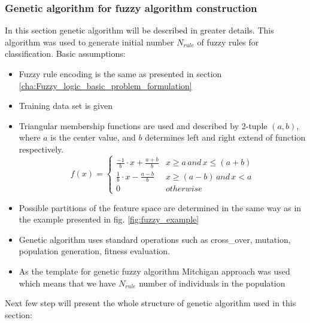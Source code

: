 \subsubsection{Genetic algorithm for  fuzzy algorithm construction}
\label{cha:Fuzzy_logic_genetic_algorithm}
In this section genetic algorithm will be described in greater details. This
algorithm was used to generate initial number $N_{rule}$ of fuzzy rules for
classification. 
Basic assumptions:
\begin{itemize}
    \item Fuzzy rule encoding is the same as presented in section \ref{cha:Fuzzy_logic_basic_problem_formulation}
    \item Training data set is given
    \item Triangular membership functions are used and described by 2-tuple
        $(a, b)$, where $a$ is the center value, and
        $b$ determines left and right extend of function respectively.
        \begin{equation}
            f(x) = 
            \begin{cases}
                \frac{-1}{b}\cdot x + \frac{a+b}{b} &
                x \geq a \, and \, x \leq (a+b) \\
                \frac{1}{b}\cdot x - \frac{a-b}{b} &
                x \geq (a - b)\, and\, x < a \\
                0 & otherwise
            \end{cases}
            \label{eq:fuzzy_function}
        \end{equation}
    \item Possible partitions of the feature space are determined in the same
        way as in the example presented in fig. \ref{fig:fuzzy_example}
    \item Genetic algorithm uses standard operations such as cross\_over,
        mutation, population generation, fitness evaluation.
    \item As the template for genetic fuzzy algorithm Mitchigan approach was
        used which means that we have $N_{rule}$ number of individuals in the
        population
\end{itemize}
Next few step will present the whole structure of genetic algorithm used in
this section:
